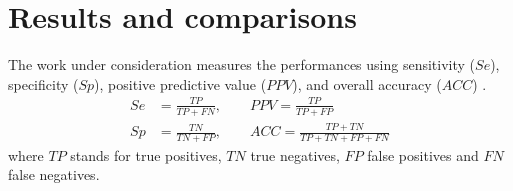 \section{Results and comparisons}
The work under consideration measures the performances using sensitivity ($Se$), specificity ($Sp$), positive predictive value ($PPV$), and overall accuracy ($ACC$) \cite[p. 6]{zhou2015}.
\begin{equation}
\label{eq:metrics}
\begin{aligned} S e &=\frac{T P}{T P+F N},\qquad P P V=\frac{T P}{T P+F P} \\ S p &=\frac{T N}{T N+F P}, \qquad A C C=\frac{T P+T N}{T P+T N+F P+F N} \end{aligned}
\end{equation}
where $TP$ stands for true positives, $TN$ true negatives, $FP$ false positives and $FN$ false negatives.
